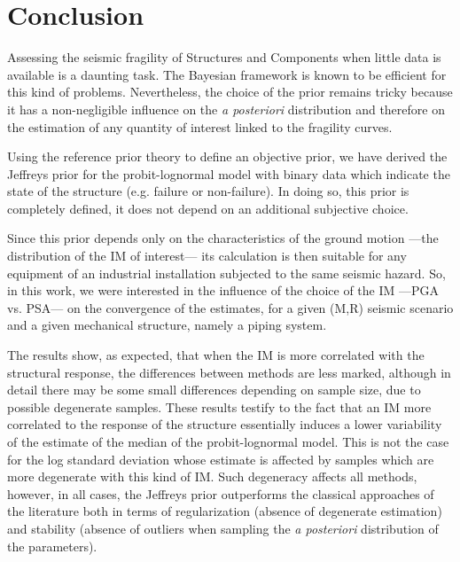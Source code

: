 
\section{Conclusion}  \label{uncIM:sec:conclusion}

Assessing the seismic fragility of Structures and Components when little data is available is a daunting task. The Bayesian framework is known to be efficient for this kind of problems. Nevertheless, the choice of the prior remains tricky because it has a non-negligible influence on the  \emph{a posteriori} distribution and therefore on the estimation of any quantity of interest linked to the fragility curves.

Using the reference prior theory to define an objective prior, we have derived the Jeffreys prior for the probit-lognormal model with binary data which indicate the state of the structure (e.g. failure or non-failure). In doing so, this prior is completely defined, it does not depend on an additional subjective choice.

Since this prior depends only on the characteristics of the ground motion ---the distribution of the IM of interest--- its calculation is then suitable for any equipment of an industrial installation subjected to the same seismic hazard. So, in this work, we were interested in the influence of the choice of the IM ---PGA vs. PSA--- on the convergence of the estimates, for a given (M,R) seismic scenario and a given mechanical structure, namely a piping system.

The results show, as expected, that when the IM is more correlated with the structural response, the differences between methods are less marked, although in detail there may be some small differences depending on sample size, due to possible degenerate samples. {These results testify to the fact that an IM more correlated to the response of the structure essentially induces a lower variability of the estimate of the median of the probit-lognormal model. This is not the case for the log standard deviation whose estimate is affected by samples which are more degenerate with this kind of IM. Such degeneracy affects all methods,} however, in all cases, the Jeffreys prior outperforms the classical approaches of the literature both in terms of regularization (absence of
degenerate estimation) and stability (absence of outliers when sampling the \emph{a posteriori} distribution of the parameters).

